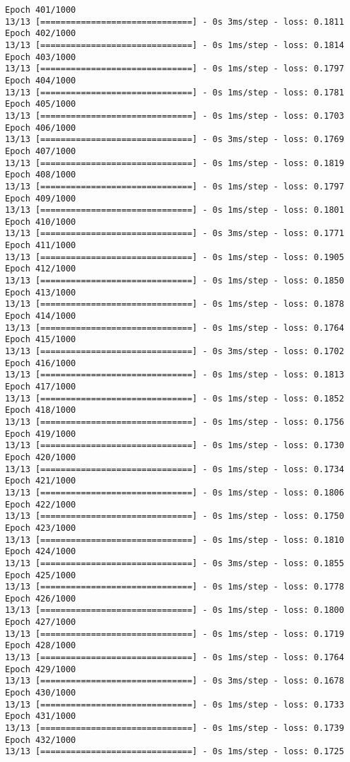 \documentclass[11pt]{article}
\begin{document}
\begin{Verbatim}[commandchars=\\\{\}]
Epoch 401/1000
13/13 [==============================] - 0s 3ms/step - loss: 0.1811
Epoch 402/1000
13/13 [==============================] - 0s 1ms/step - loss: 0.1814
Epoch 403/1000
13/13 [==============================] - 0s 1ms/step - loss: 0.1797
Epoch 404/1000
13/13 [==============================] - 0s 1ms/step - loss: 0.1781
Epoch 405/1000
13/13 [==============================] - 0s 1ms/step - loss: 0.1703
Epoch 406/1000
13/13 [==============================] - 0s 3ms/step - loss: 0.1769
Epoch 407/1000
13/13 [==============================] - 0s 1ms/step - loss: 0.1819
Epoch 408/1000
13/13 [==============================] - 0s 1ms/step - loss: 0.1797
Epoch 409/1000
13/13 [==============================] - 0s 1ms/step - loss: 0.1801
Epoch 410/1000
13/13 [==============================] - 0s 3ms/step - loss: 0.1771
Epoch 411/1000
13/13 [==============================] - 0s 1ms/step - loss: 0.1905
Epoch 412/1000
13/13 [==============================] - 0s 1ms/step - loss: 0.1850
Epoch 413/1000
13/13 [==============================] - 0s 1ms/step - loss: 0.1878
Epoch 414/1000
13/13 [==============================] - 0s 1ms/step - loss: 0.1764
Epoch 415/1000
13/13 [==============================] - 0s 3ms/step - loss: 0.1702
Epoch 416/1000
13/13 [==============================] - 0s 1ms/step - loss: 0.1813
Epoch 417/1000
13/13 [==============================] - 0s 1ms/step - loss: 0.1852
Epoch 418/1000
13/13 [==============================] - 0s 1ms/step - loss: 0.1756
Epoch 419/1000
13/13 [==============================] - 0s 1ms/step - loss: 0.1730
Epoch 420/1000
13/13 [==============================] - 0s 1ms/step - loss: 0.1734
Epoch 421/1000
13/13 [==============================] - 0s 1ms/step - loss: 0.1806
Epoch 422/1000
13/13 [==============================] - 0s 1ms/step - loss: 0.1750
Epoch 423/1000
13/13 [==============================] - 0s 1ms/step - loss: 0.1810
Epoch 424/1000
13/13 [==============================] - 0s 3ms/step - loss: 0.1855
Epoch 425/1000
13/13 [==============================] - 0s 1ms/step - loss: 0.1778
Epoch 426/1000
13/13 [==============================] - 0s 1ms/step - loss: 0.1800
Epoch 427/1000
13/13 [==============================] - 0s 1ms/step - loss: 0.1719
Epoch 428/1000
13/13 [==============================] - 0s 1ms/step - loss: 0.1764
Epoch 429/1000
13/13 [==============================] - 0s 3ms/step - loss: 0.1678
Epoch 430/1000
13/13 [==============================] - 0s 1ms/step - loss: 0.1733
Epoch 431/1000
13/13 [==============================] - 0s 1ms/step - loss: 0.1739
Epoch 432/1000
13/13 [==============================] - 0s 1ms/step - loss: 0.1725

\end{Verbatim}
\end{document}

